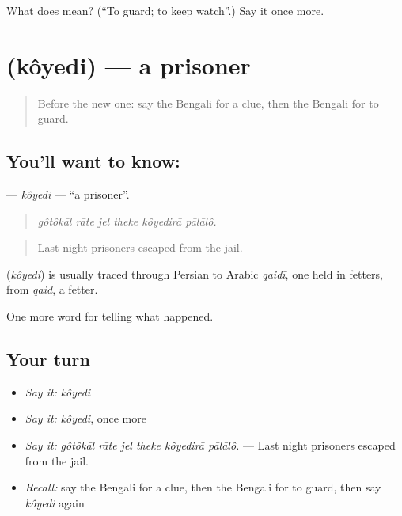 \begin{tcolorbox}[breakable,colback=teal!4,colframe=teal!35!black,title={Before you move on}]
What does   mean? (\textquotedblleft{}To guard; to keep watch\textquotedblright{}.) Say it once more.
\end{tcolorbox}
\section[\texorpdfstring{\bn{কয়েদি} (kôyedi)}{কয়েদি (kôyedi)}]{ (kôyedi) — a prisoner}

\label{lesson:BN-C284-koyedi}



\begin{quote}
Before the new one: say the Bengali for a clue, then the Bengali for to guard.
\end{quote}

\subsection*{You'll want to know: }
\textbf{} — \emph{kôyedi} — \textquotedblleft{}a prisoner\textquotedblright{}.

\begin{quote}
     
\end{quote}

\begin{quote}
\emph{gôtôkāl rāte jel theke kôyedirā pālālô.}
\end{quote}

\begin{quote}
Last night prisoners escaped from the jail.
\end{quote}

\begin{cousinweb}
\textbf{} (\emph{kôyedi}) is usually traced through Persian to Arabic \emph{qaidī}, one held in fetters, from \emph{qaid}, a fetter.
\end{cousinweb}

\begin{grammarlens}[title={What you've built}]
One more word for telling what happened.
\end{grammarlens}

\subsection*{Your turn}
\begin{itemize}
\raggedright
  \item \emph{Say it:} \emph{kôyedi}
  \item \emph{Say it:} \emph{kôyedi}, once more
  \item \emph{Say it:} \emph{gôtôkāl rāte jel theke kôyedirā pālālô.} — Last night prisoners escaped from the jail.
  \item \emph{Recall:} say the Bengali for a clue, then the Bengali for to guard, then say \emph{kôyedi} again
\end{itemize}

